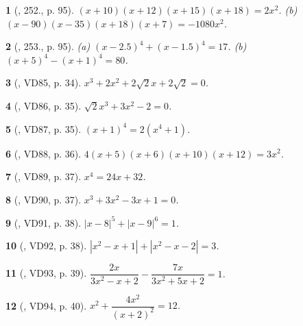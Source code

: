 \documentclass{article}
\newtheorem{baitoan}{}
\begin{document}
\begin{baitoan}[\cite{Tuyen_Toan_9_old}, 252., p. 95]
	$(x + 10)(x + 12)(x + 15)(x + 18) = 2x^2$. (b) $(x - 90)(x - 35)(x + 18)(x + 7) = -1080x^2$.
\end{baitoan}

\begin{baitoan}[\cite{Tuyen_Toan_9_old}, 253., p. 95]
	(a) $(x - 2.5)^4 + (x - 1.5)^4 = 17$. (b) $(x + 5)^4 - (x + 1)^4 = 80$.
\end{baitoan}

\begin{baitoan}[\cite{Binh_Toan_9_tap_2}, VD85, p. 34]
	$x^3 + 2x^2 + 2\sqrt{2}x + 2\sqrt{2} = 0$.
\end{baitoan}

\begin{baitoan}[\cite{Binh_Toan_9_tap_2}, VD86, p. 35]
	$\sqrt{2}x^3 + 3x^2 - 2 = 0$.
\end{baitoan}

\begin{baitoan}[\cite{Binh_Toan_9_tap_2}, VD87, p. 35]
	$(x + 1)^4 = 2(x^4 + 1)$.
\end{baitoan}

\begin{baitoan}[\cite{Binh_Toan_9_tap_2}, VD88, p. 36]
	$4(x + 5)(x + 6)(x + 10)(x + 12) = 3x^2$.
\end{baitoan}

\begin{baitoan}[\cite{Binh_Toan_9_tap_2}, VD89, p. 37]
	$x^4 = 24x + 32$.
\end{baitoan}

\begin{baitoan}[\cite{Binh_Toan_9_tap_2}, VD90, p. 37]
	$x^3 + 3x^2 - 3x + 1 = 0$.
\end{baitoan}

\begin{baitoan}[\cite{Binh_Toan_9_tap_2}, VD91, p. 38]
	$|x - 8|^5 + |x - 9|^6 = 1$.
\end{baitoan}

\begin{baitoan}[\cite{Binh_Toan_9_tap_2}, VD92, p. 38]
	$|x^2 - x + 1| + |x^2 - x - 2| = 3$.
\end{baitoan}

\begin{baitoan}[\cite{Binh_Toan_9_tap_2}, VD93, p. 39]
	$\dfrac{2x}{3x^2 - x + 2} - \dfrac{7x}{3x^2 + 5x + 2} = 1$.
\end{baitoan}

\begin{baitoan}[\cite{Binh_Toan_9_tap_2}, VD94, p. 40]
	$x^2 + \dfrac{4x^2}{(x + 2)^2} = 12$.
\end{baitoan}
\end{document}
